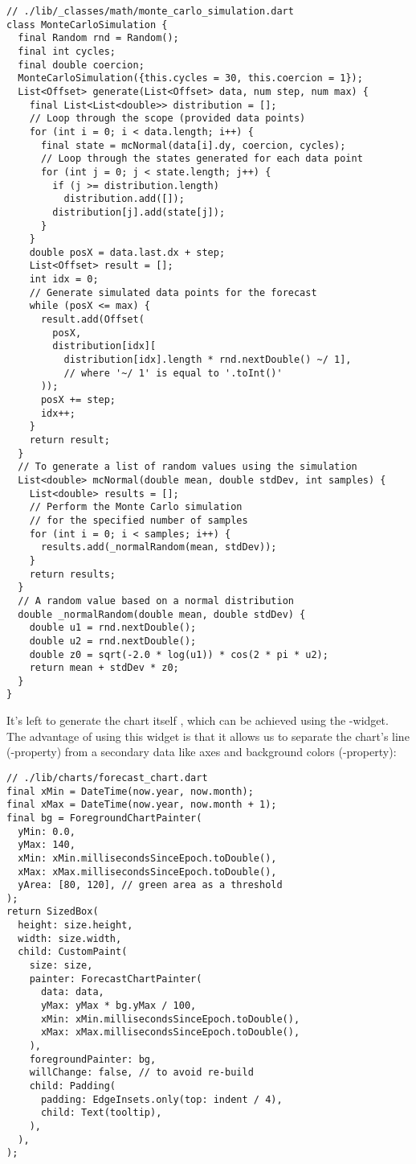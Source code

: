 \begin{lstlisting}
// ./lib/_classes/math/monte_carlo_simulation.dart
class MonteCarloSimulation {
  final Random rnd = Random();
  final int cycles;
  final double coercion;
  MonteCarloSimulation({this.cycles = 30, this.coercion = 1});
  List<Offset> generate(List<Offset> data, num step, num max) {
    final List<List<double>> distribution = [];
    // Loop through the scope (provided data points)
    for (int i = 0; i < data.length; i++) {
      final state = mcNormal(data[i].dy, coercion, cycles);
      // Loop through the states generated for each data point
      for (int j = 0; j < state.length; j++) {
        if (j >= distribution.length)
          distribution.add([]);
        distribution[j].add(state[j]);
      }
    }
    double posX = data.last.dx + step;
    List<Offset> result = [];
    int idx = 0;
    // Generate simulated data points for the forecast
    while (posX <= max) {
      result.add(Offset(
        posX, 
        distribution[idx][
          distribution[idx].length * rnd.nextDouble() ~/ 1],
          // where '~/ 1' is equal to '.toInt()'
      ));
      posX += step;
      idx++;
    }
    return result;
  }
  // To generate a list of random values using the simulation
  List<double> mcNormal(double mean, double stdDev, int samples) {
    List<double> results = [];
    // Perform the Monte Carlo simulation 
    // for the specified number of samples
    for (int i = 0; i < samples; i++) {
      results.add(_normalRandom(mean, stdDev));
    }
    return results;
  }
  // A random value based on a normal distribution
  double _normalRandom(double mean, double stdDev) {
    double u1 = rnd.nextDouble();
    double u2 = rnd.nextDouble();
    double z0 = sqrt(-2.0 * log(u1)) * cos(2 * pi * u2);
    return mean + stdDev * z0;
  }
}
\end{lstlisting}

\noindent It's left to generate the chart itself , which can be achieved using the -widget. 
The advantage of using this widget is that it allows us to separate the chart's line (-property) from a
secondary data like axes and background colors (-property):

\begin{lstlisting}
// ./lib/charts/forecast_chart.dart
final xMin = DateTime(now.year, now.month);
final xMax = DateTime(now.year, now.month + 1);
final bg = ForegroundChartPainter(
  yMin: 0.0,
  yMax: 140,
  xMin: xMin.millisecondsSinceEpoch.toDouble(),
  xMax: xMax.millisecondsSinceEpoch.toDouble(),
  yArea: [80, 120], // green area as a threshold
);
return SizedBox(
  height: size.height,
  width: size.width,
  child: CustomPaint(
    size: size,
    painter: ForecastChartPainter(
      data: data,
      yMax: yMax * bg.yMax / 100,
      xMin: xMin.millisecondsSinceEpoch.toDouble(),
      xMax: xMax.millisecondsSinceEpoch.toDouble(),
    ),
    foregroundPainter: bg,
    willChange: false, // to avoid re-build
    child: Padding(
      padding: EdgeInsets.only(top: indent / 4),
      child: Text(tooltip),
    ),
  ),
);
\end{lstlisting}

